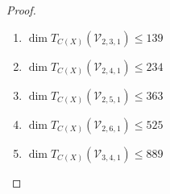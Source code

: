 \documentclass[11pt,twoside]{amsart}
\theoremstyle{plain}
\numberwithin{equation}{section}
\theoremstyle{definition}
\begin{document}
\begin{proof}
\begin{enumerate}

      

      
      \item $\operatorname{dim}T_{C(X)}(\mathcal{V}_{2,3,1}) \leq 139$

      \item $\operatorname{dim}T_{C(X)}(\mathcal{V}_{2,4,1}) \leq 234$

      \item $\operatorname{dim}T_{C(X)}(\mathcal{V}_{2,5,1}) \leq 363$

      \item $\operatorname{dim}T_{C(X)}(\mathcal{V}_{2,6,1}) \leq 525$

      \item $\operatorname{dim}T_{C(X)}(\mathcal{V}_{3,4,1}) \leq 889$


\end{enumerate}
\end{proof}
\end{document}
